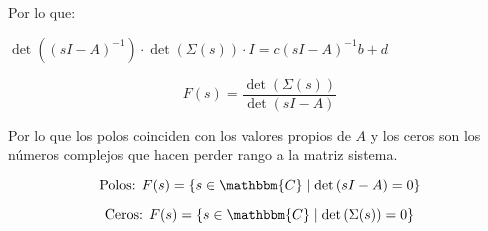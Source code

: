 Por lo que:

\begin{math}
\det{\left( (sI - A)^{-1} \right)} \cdot \det{\left( \Sigma(s) \right)} \cdot I = c(sI - A)^{-1} b + d
\end{math}

\begin{equation}
F(s) = \frac{\det{\left( \Sigma(s) \right)}}{\det{\left( sI - A \right)}}
\end{equation}

Por lo que los polos coinciden con los valores propios de $A$ y los ceros son los números complejos que hacen perder rango a la matriz sistema.

\begin{equation}
\text{Polos: } F(s) = \left\{ s \in \mathbbm{C} \mid \det{\left( sI - A \right)} = 0 \right\}
\end{equation}

\begin{equation}
\text{Ceros: } F(s) = \left\{ s \in \mathbbm{C} \mid \det{\left( \Sigma(s) \right)} = 0 \right\}
\end{equation}

